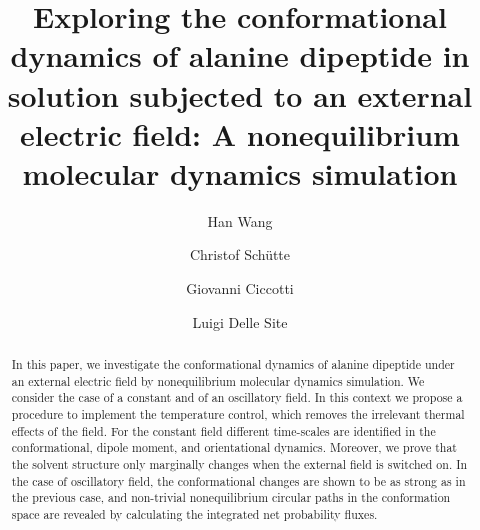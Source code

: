 \documentclass[a4paper,preprint,unsortedaddress,onecolumn]{revtex4-1}
\begin{document}
\title{Exploring the conformational dynamics of alanine dipeptide in solution subjected to an external electric field: A nonequilibrium molecular dynamics simulation}
\author{Han Wang}
\author{Christof Sch\"utte}
\author{Giovanni Ciccotti}
\author{Luigi Delle Site}
   
\begin{abstract}
In this paper, we investigate the conformational dynamics of alanine
   dipeptide under an external electric field by 
   nonequilibrium molecular dynamics simulation.  We consider
   the case of a constant and of an oscillatory field. In this context we
propose a procedure to
   implement the temperature control, which removes the irrelevant thermal
effects of the field. For the constant field different time-scales are
   identified  in the conformational, dipole moment, and orientational
   dynamics. Moreover, we prove that the solvent structure only
   marginally changes when the external field is switched on.  In the
   case of oscillatory field, the conformational changes are shown to be as
   strong as in the previous case, and non-trivial nonequilibrium
   circular paths in the conformation space are revealed by calculating the
   integrated net probability fluxes.
\end{abstract}
\end{document}
